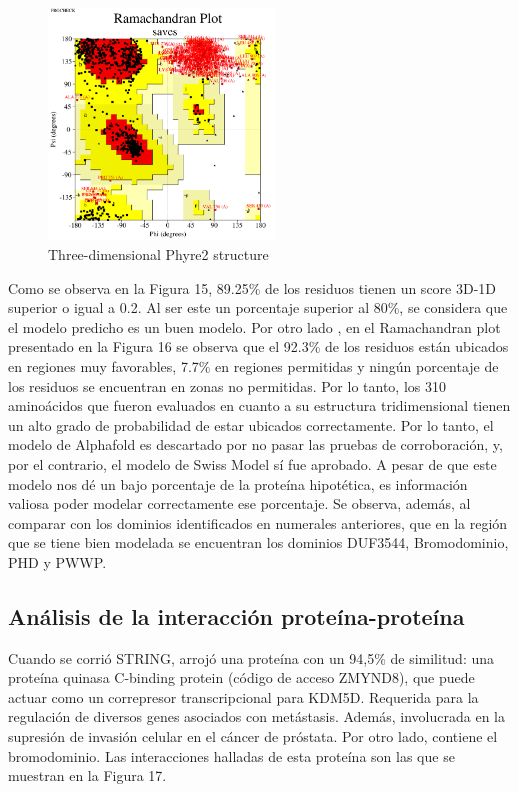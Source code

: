 \documentclass[journal,transmag]{IEEEtran}
\begin{document}
\begin{figure}[!h]
	\center
	\includegraphics[width=6cm]{imagenes/ramachandran.png}
	\caption{Three-dimensional Phyre2 structure}
	\label{17}
\end{figure}
Como se observa en la Figura 15,  89.25\% de los residuos tienen un score 3D-1D superior o igual a 0.2. Al ser este un porcentaje superior al 80\%, se considera que el modelo predicho es un buen modelo. Por otro lado , en el Ramachandran plot presentado en la Figura 16  se observa que el 92.3\% de los residuos están ubicados en regiones muy favorables, 7.7\% en regiones permitidas y ningún porcentaje de los residuos se encuentran en zonas no permitidas. Por lo tanto, los 310 aminoácidos que fueron evaluados en cuanto a su estructura tridimensional tienen un alto grado de probabilidad de estar ubicados correctamente. 
Por lo tanto, el modelo de Alphafold es descartado por no pasar las pruebas de corroboración, y, por el contrario, el modelo de Swiss Model sí fue aprobado. A pesar de que este modelo nos dé un bajo porcentaje de la proteína hipotética, es información valiosa poder modelar correctamente ese porcentaje.
Se observa, además, al comparar con los dominios identificados en numerales anteriores, que en la región que se tiene bien modelada se encuentran los dominios DUF3544, Bromodominio, PHD y PWWP. 


\subsection{\textbf{ Análisis de la interacción proteína-proteína}}

Cuando se corrió STRING, arrojó una proteína con un 94,5\% de similitud: una proteína quinasa C-binding protein (código de acceso ZMYND8), que puede actuar como un correpresor transcripcional para KDM5D. Requerida para la regulación de diversos genes asociados con metástasis. Además, involucrada en la supresión de invasión celular en el cáncer de próstata. Por otro lado, contiene el bromodominio.    
Las interacciones halladas de esta proteína son las que se muestran en la Figura 17. 
\end{document}
